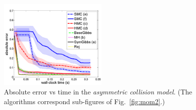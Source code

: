 \documentclass[]{article}
\begin{document}
\begin{figure}
\centering
     \includegraphics[width=0.8\linewidth, height=125pt]
{plotsx/vis-col/err-vs-time__param2-shaded.pdf}
      \caption{
Absolute error vs time in the \emph{asymmetric collision model}. (The algorithms correspond sub-figures of Fig.~\ref{fig:mom2}.)
 }
\label{fig:asymmetric}
\end{figure}
\end{document}
